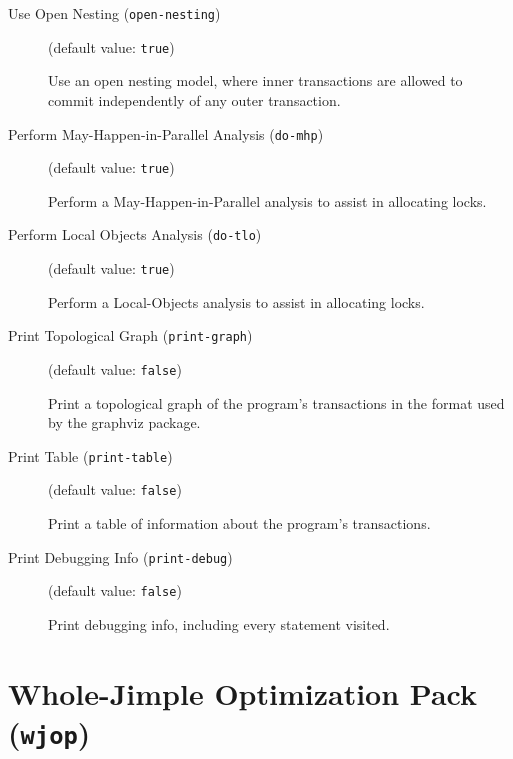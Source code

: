 \documentclass{article}
\begin{document}
\begin{description}
\item[Use Open Nesting ({\tt open-nesting})]
(default value: {\tt true})




Use an open nesting model, where inner transactions are allowed to commit
independently of any outer transaction.



\item[Perform May-Happen-in-Parallel Analysis ({\tt do-mhp})]
(default value: {\tt true})




Perform a May-Happen-in-Parallel analysis to assist in allocating locks.



\item[Perform Local Objects Analysis ({\tt do-tlo})]
(default value: {\tt true})




Perform a Local-Objects analysis to assist in allocating locks.



\item[Print Topological Graph ({\tt print-graph})]
(default value: {\tt false})




Print a topological graph of the program's transactions in the format used by the graphviz package.



\item[Print Table ({\tt print-table})]
(default value: {\tt false})




Print a table of information about the program's transactions.



\item[Print Debugging Info ({\tt print-debug})]
(default value: {\tt false})




Print debugging info, including every statement visited.



\end{description}

\section{Whole-Jimple Optimization Pack ({\tt wjop})}


\par
\end{document}
